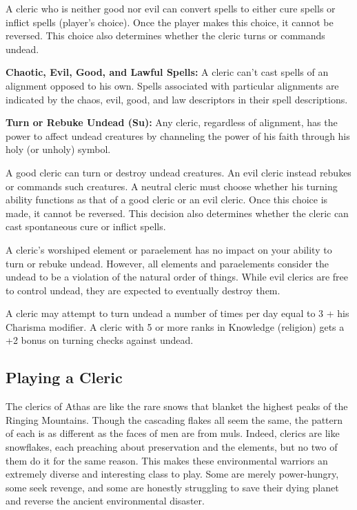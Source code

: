 A cleric who is neither good nor evil can convert spells to either cure spells or inflict spells (player's choice). Once the player makes this choice, it cannot be reversed. This choice also determines whether the cleric turns or commands undead.

\textbf{Chaotic, Evil, Good, and Lawful Spells:} A cleric can't cast spells of an alignment opposed to his own. Spells associated with particular alignments are indicated by the chaos, evil, good, and law descriptors in their spell descriptions.

\textbf{Turn or Rebuke Undead (Su):} Any cleric, regardless of alignment, has the power to affect undead creatures by channeling the power of his faith through his holy (or unholy) symbol.

A good cleric can turn or destroy undead creatures. An evil cleric instead rebukes or commands such creatures. A neutral cleric must choose whether his turning ability functions as that of a good cleric or an evil cleric. Once this choice is made, it cannot be reversed. This decision also determines whether the cleric can cast spontaneous cure or inflict spells.

A cleric's worshiped element or paraelement has no impact on your ability to turn or rebuke undead. However, all elements and paraelements consider the undead to be a violation of the natural order of things. While evil clerics are free to control undead, they are expected to eventually destroy them.

A cleric may attempt to turn undead a number of times per day equal to 3 + his Charisma modifier. A cleric with 5 or more ranks in Knowledge (religion) gets a +2 bonus on turning checks against undead.

\subsection{Playing a Cleric}
The clerics of Athas are like the rare snows that blanket the highest peaks of the Ringing Mountains. Though the cascading flakes all seem the same, the pattern of each is as different as the faces of men are from muls. Indeed, clerics are like snowflakes, each preaching about preservation and the elements, but no two of them do it for the same reason. This makes these environmental warriors an extremely diverse and interesting class to play. Some are merely power-hungry, some seek revenge, and some are honestly struggling to save their dying planet and reverse the ancient environmental disaster.

